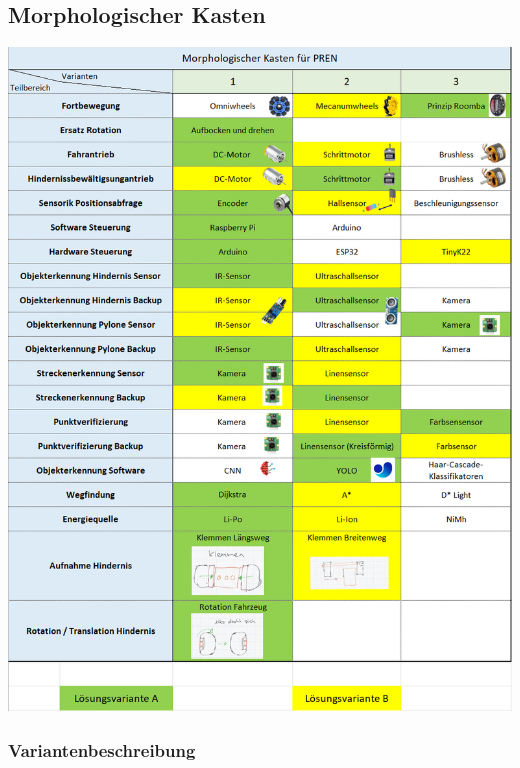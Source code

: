 \documentclass[../main.tex]{subfiles}
\begin{document}
\subsection{Morphologischer Kasten}
    \includegraphics[width=\textwidth]{img/Morphologischer_Kasten.png}

    \subsubsection{Variantenbeschreibung}
\end{document}
